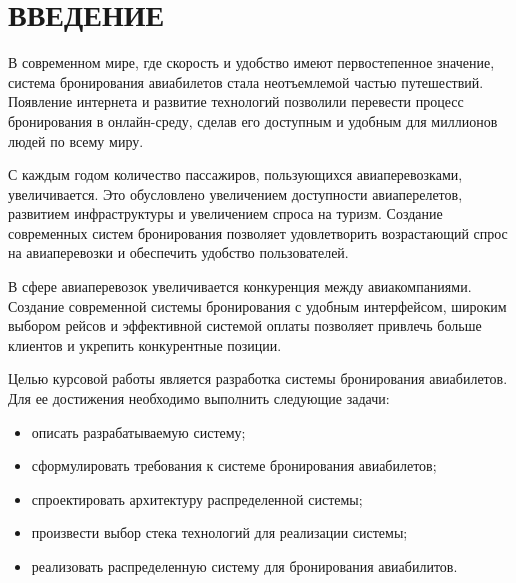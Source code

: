 \maketableofcontents

\chapter*{\textbf{ВВЕДЕНИЕ}}


В современном мире, где скорость и удобство имеют первостепенное значение, система бронирования авиабилетов стала неотъемлемой частью путешествий. Появление интернета и развитие технологий позволили перевести процесс бронирования в онлайн-среду, сделав его доступным и удобным для миллионов людей по всему миру.

С каждым годом количество пассажиров, пользующихся авиаперевозками, увеличивается. Это обусловлено увеличением доступности авиаперелетов, развитием инфраструктуры и увеличением спроса на туризм. Создание современных систем бронирования позволяет удовлетворить возрастающий спрос на авиаперевозки и обеспечить удобство пользователей.

В сфере авиаперевозок увеличивается конкуренция между авиакомпаниями. Создание современной системы бронирования с удобным интерфейсом, широким выбором рейсов и эффективной системой оплаты позволяет привлечь больше клиентов и укрепить конкурентные позиции.

Целью курсовой работы является разработка системы бронирования авиабилетов. Для ее достижения необходимо выполнить следующие задачи:

\begin{itemize}
  \item описать разрабатываемую систему;
  \item сформулировать требования к системе бронирования авиабилетов;
  \item спроектировать архитектуру распределенной системы;
  \item произвести выбор стека технологий для реализации системы;
  \item реализовать распределенную систему для бронирования авиабилитов.
\end{itemize}